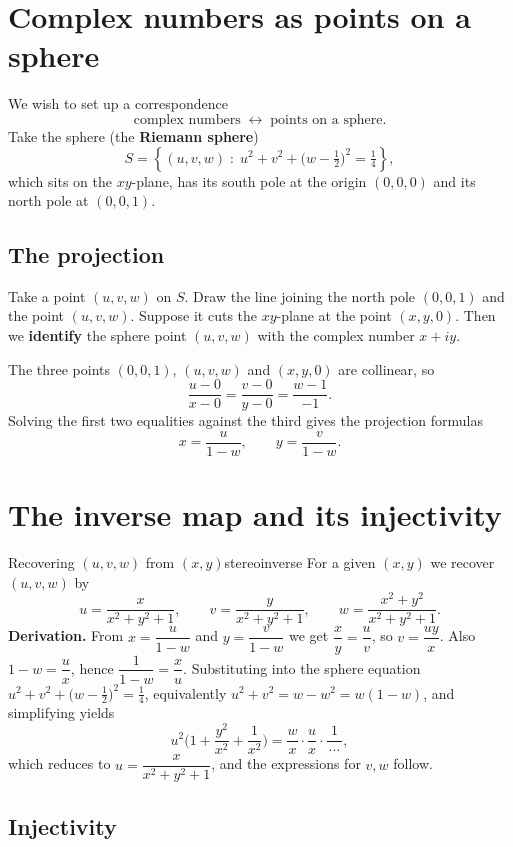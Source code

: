 \documentclass[11pt,openany]{report}
\newcommand{\set}[1]{\left\{ #1 \right\}}
\begin{document}
\section{Complex numbers as points on a sphere}

We wish to set up a correspondence
\[
  \text{complex numbers} \;\longleftrightarrow\; \text{points on a sphere}.
\]
Take the sphere (the \textbf{Riemann sphere})
\[
  S = \set{ (u,v,w) \;:\; u^2+v^2+\Big(w-\tfrac12\Big)^2 = \tfrac14 },
\]
which sits on the $xy$-plane, has its south pole at the origin $(0,0,0)$ and its north
pole at $(0,0,1)$.

\subsection{The projection}

Take a point $(u,v,w)$ on $S$. Draw the line joining the north pole $(0,0,1)$ and the
point $(u,v,w)$. Suppose it cuts the $xy$-plane at the point $(x,y,0)$. Then we
\textbf{identify} the sphere point $(u,v,w)$ with the complex number $x+iy$.

The three points $(0,0,1)$, $(u,v,w)$ and $(x,y,0)$ are collinear, so
\[
  \frac{u-0}{x-0} = \frac{v-0}{y-0} = \frac{w-1}{-1}.
\]
Solving the first two equalities against the third gives the projection formulas
\[
  \boxed{\;x = \frac{u}{1-w}, \qquad y = \frac{v}{1-w}.\;}
\]

\section{The inverse map and its injectivity}

\begin{example}{Recovering $(u,v,w)$ from $(x,y)$}{stereoinverse}
For a given $(x,y)$ we recover $(u,v,w)$ by
\[
  u = \frac{x}{x^2+y^2+1}, \qquad
  v = \frac{y}{x^2+y^2+1}, \qquad
  w = \frac{x^2+y^2}{x^2+y^2+1}.
\]
\textbf{Derivation.} From $x=\dfrac{u}{1-w}$ and $y=\dfrac{v}{1-w}$ we get
$\dfrac{x}{y}=\dfrac{u}{v}$, so $v=\dfrac{uy}{x}$. Also $1-w=\dfrac{u}{x}$, hence
$\dfrac{1}{1-w}=\dfrac{x}{u}$. Substituting into the sphere equation
$u^2+v^2+\big(w-\tfrac12\big)^2=\tfrac14$, equivalently
$u^2+v^2 = w-w^2 = w(1-w)$, and simplifying yields
\[
  u^2\Big(1+\frac{y^2}{x^2}+\frac1{x^2}\Big) = \frac{w}{x}\cdot\frac{u}{x}\cdot\frac{1}{\,\cdots\,},
\]
which reduces to $u = \dfrac{x}{x^2+y^2+1}$, and the expressions for $v,w$ follow.
\end{example}

\subsection{Injectivity}
\end{document}
